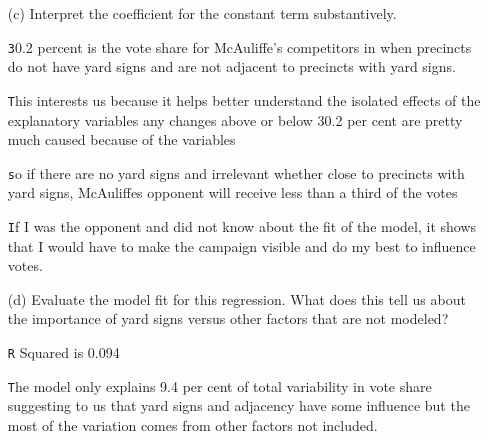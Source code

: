 \documentclass[12pt,letterpaper]{article}
\begin{document}
\begin{enumerate}
	\vspace{0.5cm}
	
	\vspace{7cm}
	\item [(c)] Interpret the coefficient for the constant term substantively.

    \vspace{0.5cm}

    \texttt 30.2 percent is the vote share for McAuliffe's competitors in  when precincts do not have yard signs and are not adjacent to precincts with yard signs.
    
    \vspace{0.5cm}
    
    \texttt This interests us because it helps better understand the isolated effects of the explanatory variables any changes above or below 30.2 per cent are pretty much caused because of the variables
    
    \vspace{0.5cm}
    
    \texttt so if there are no yard signs and irrelevant whether close to precincts with yard signs, McAuliffes opponent will receive less than a third of the votes

    \vspace{0.5cm}

    \texttt If I was the opponent and did not know about the fit of the model, it shows that I would have to make the campaign visible and do my best to influence votes.

    \vspace{0.5cm}
	
	
	
	\item [(d)] Evaluate the model fit for this regression.  What does this	tell us about the importance of yard signs versus other factors that are not modeled?
	
	\vspace{0.5cm}
	
	\texttt R Squared is 0.094
	
	\vspace{0.5cm}
	
	\texttt The model only explains 9.4 per cent of total variability in vote share suggesting to us that yard signs and adjacency have some influence but the most of the variation comes from other factors not included.
	
	\vspace{0.5cm}
	

\end{enumerate}
\end{document}
